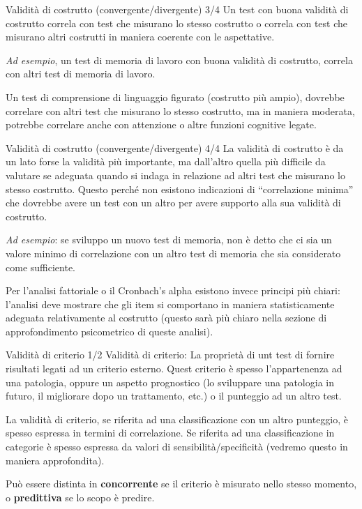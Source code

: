 \documentclass[
  ignorenonframetext,
]{beamer}
\begin{document}
\begin{frame}{Validità di costrutto (convergente/divergente) 3/4}
\label{validituxe0-di-costrutto-convergentedivergente-34}
Un test con buona validità di costrutto correla con test che misurano lo
stesso costrutto o correla con test che misurano altri costrutti in
maniera coerente con le aspettative.

\emph{Ad esempio}, un test di memoria di lavoro con buona validità di
costrutto, correla con altri test di memoria di lavoro.

Un test di comprensione di linguaggio figurato (costrutto più ampio),
dovrebbe correlare con altri test che misurano lo stesso costrutto, ma
in maniera moderata, potrebbe correlare anche con attenzione o altre
funzioni cognitive legate.
\end{frame}

\begin{frame}{Validità di costrutto (convergente/divergente) 4/4}
\label{validituxe0-di-costrutto-convergentedivergente-44}
La validità di costrutto è da un lato forse la validità più importante,
ma dall'altro quella più difficile da valutare se adeguata quando si
indaga in relazione ad altri test che misurano lo stesso costrutto.
Questo perché non esistono indicazioni di ``correlazione minima'' che
dovrebbe avere un test con un altro per avere supporto alla sua validità
di costrutto.

\emph{Ad esempio}: se sviluppo un nuovo test di memoria, non è detto che
ci sia un valore minimo di correlazione con un altro test di memoria che
sia considerato come sufficiente.

Per l'analisi fattoriale o il Cronbach's alpha esistono invece principi
più chiari: l'analisi deve mostrare che gli item si comportano in
maniera statisticamente adeguata relativamente al costrutto (questo sarà
più chiaro nella sezione di approfondimento psicometrico di queste
analisi).
\end{frame}

\begin{frame}{Validità di criterio 1/2}
\label{validituxe0-di-criterio-12}
Validità di criterio: La proprietà di unt test di fornire risultati
legati ad un criterio esterno. Quest criterio è spesso l'appartenenza ad
una patologia, oppure un aspetto prognostico (lo sviluppare una
patologia in futuro, il migliorare dopo un trattamento, etc.) o il
punteggio ad un altro test.

La validità di criterio, se riferita ad una classificazione con un altro
punteggio, è spesso espressa in termini di correlazione. Se riferita ad
una classificazione in categorie è spesso espressa da valori di
sensibilità/specificità (vedremo questo in maniera approfondita).

Può essere distinta in \textbf{concorrente} se il criterio è misurato
nello stesso momento, o \textbf{predittiva} se lo scopo è predire.
\end{frame}
\end{document}
